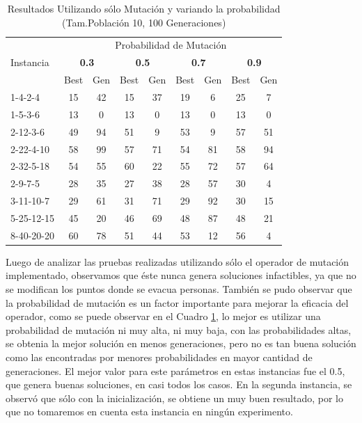 \documentclass[letter, 10pt]{article}
\begin{document}
\begin{table}[]
\centering
\begin{tabular}{l|cccccccc}
    \hline
                &\multicolumn{8}{c}{Probabilidad de Mutación}\\
   Instancia    &\multicolumn{2}{c}{\textbf{0.3}}&\multicolumn{2}{c}{\textbf{0.5}}&\multicolumn{2}{c}{\textbf{0.7}}&\multicolumn{2}{c}{\textbf{0.9}}\\
                &Best   & Gen   &Best   & Gen   & Best  & Gen   &   Best    & Gen\\

    \hline
    1-4-2-4     &   15  &   42  & 15    &   37  &  19   &   6   &   25  &   7 \\
    1-5-3-6     &   13  &   0   &   13  &   0   &   13  &   0   &   13  &   0\\ 
    2-12-3-6    &   49  &   94  &   51  &   9   &   53  &   9   &   57  &   51\\
    2-22-4-10   &   58  &   99  &   57  &   71  &   54  &   81  &   58  &   94\\
    2-32-5-18   &   54  &   55  &   60  &   22  &   55  &   72  &   57  &   64\\
    2-9-7-5     &   28  &   35  &   27  &   38  &   28  &   57  &   30  &   4 \\
    3-11-10-7   &   29  &   61  &   31  &   71  &   29  &   92  &   30  &   15\\
    5-25-12-15  &   45  &   20  &   46  &   69  &   48  &   87  &   48  &   21\\
    8-40-20-20  &   60  &   78  &   51  &   44  &   53  &   12  &   56  &   4
\end{tabular}
\caption{Resultados Utilizando sólo Mutación y variando la probabilidad (Tam.Población 10, 100 Generaciones)}
\label{tab:mutate}
\end{table}


Luego de analizar las pruebas realizadas utilizando sólo el operador de mutación implementado, observamos que éste nunca genera soluciones infactibles, ya que no se modifican los puntos donde se evacua personas. También se pudo observar que la probabilidad de mutación es un factor importante para mejorar la eficacia del operador, como se puede observar en el Cuadro \ref{tab:mutate}, lo mejor es utilizar una probabilidad de mutación ni muy alta, ni muy baja, con las probabilidades altas, se obtenia la mejor solución en menos generaciones, pero no es tan buena solución como las encontradas por menores probabilidades en mayor cantidad de generaciones. El mejor valor para este parámetros en estas instancias fue el 0.5, que genera buenas soluciones, en casi todos los casos. En la segunda instancia, se observó que sólo con la inicialización, se obtiene un muy buen resultado, por lo que no tomaremos en cuenta esta instancia en ningún experimento. 
\end{document}
